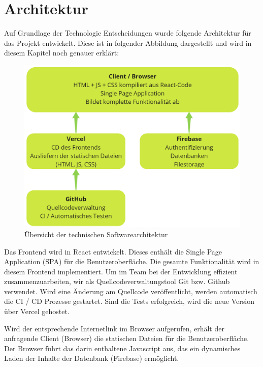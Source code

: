 \chapter{Architektur}
\label{ch:architecture}

Auf Grundlage der Technologie Entscheidungen wurde folgende Architektur für das Projekt entwickelt.
Diese ist in folgender Abbildung dargestellt und wird in diesem Kapitel noch genauer erklärt:

\begin{figure}[ht!]
  \begin{centering}
    \includegraphics[width=.75\textwidth]{figures/architecture/architecture.png}
    \caption{Übersicht der technischen Softwarearchitektur}
    \label{fig:technicalArchitecture}
  \end{centering}
\end{figure}

Das Frontend wird in React entwickelt. Dieses enthält die Single Page Application (SPA) für die Benutzeroberfläche. Die gesamte Funktionalität wird in diesem Frontend implementiert.
Um im Team bei der Entwicklung effizient zusammenzuarbeiten, wir als Quellcodeverwaltungstool Git bzw. Github verwendet.
Wird eine Änderung am Quellcode veröffentlicht, werden automatisch die CI / CD Prozesse gestartet.
Sind die Tests erfolgreich, wird die neue Version über Vercel gehostet.

Wird der entsprechende Internetlink im Browser aufgerufen, erhält der anfragende Client (Browser) die statischen Dateien für die Benutzeroberfläche.
Der Browser führt das darin enthaltene Javascript aus, das ein dynamisches Laden der Inhalte der Datenbank (Firebase) ermöglicht.
